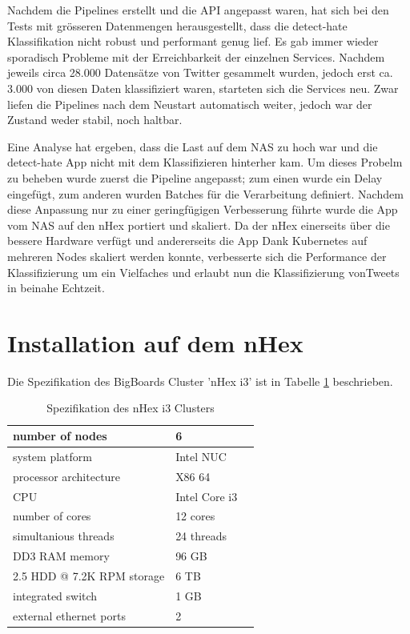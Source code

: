 Nachdem die Pipelines erstellt und die API angepasst waren, hat sich bei den Tests mit gr{\"o}sseren Datenmengen herausgestellt, dass die detect-hate Klassifikation nicht robust und performant genug lief. Es gab immer wieder sporadisch Probleme mit der Erreichbarkeit der einzelnen Services. Nachdem jeweils circa 28.000 Datens{\"a}tze von Twitter gesammelt wurden, jedoch erst ca. 3.000 von diesen Daten klassifiziert waren, starteten sich die Services neu. Zwar liefen die Pipelines nach dem Neustart automatisch weiter, jedoch war der Zustand weder stabil, noch haltbar. 

Eine Analyse hat ergeben, dass die Last auf dem NAS zu hoch war und die detect-hate App nicht mit dem Klassifizieren hinterher kam. Um dieses Probelm zu beheben wurde zuerst die Pipeline angepasst; zum einen wurde ein Delay eingef{\"u}gt, zum anderen wurden Batches f{\"u}r die Verarbeitung definiert. Nachdem diese Anpassung nur zu einer geringf{\"u}gigen Verbesserung f{\"u}hrte wurde die App vom NAS auf den nHex portiert und skaliert. Da der nHex einerseits {\"u}ber die bessere Hardware verf{\"u}gt und andererseits die App Dank Kubernetes auf mehreren Nodes skaliert werden konnte, verbesserte sich die Performance der Klassifizierung um ein Vielfaches und erlaubt nun die Klassifizierung vonTweets in beinahe Echtzeit.

\section{Installation auf dem nHex}
\label{sec:nHex}

Die Spezifikation des BigBoards Cluster 'nHex i3' ist in Tabelle \ref{tab:spez_hnex} beschrieben.

\begin{table}[H]
	\centering
		\begin{tabular}{lll} 
			number of nodes & 6 \\ \midrule
			system platform  & Intel NUC \\ \midrule
			processor architecture & X86 64 \\ \midrule
			CPU & Intel Core i3 \\ \midrule
			number of cores & 12 cores \\ \midrule
			simultanious threads & 24 threads \\ \midrule
			DD3 RAM memory & 96 GB \\ \midrule
			2.5 HDD @ 7.2K RPM storage & 6 TB \\ \midrule
			integrated switch & 1 GB \\ \midrule
			external ethernet ports & 2 \\ \bottomrule
		\end{tabular}
	\caption{Spezifikation des nHex i3 Clusters}
	\label{tab:spez_hnex}
\end{table}
 
